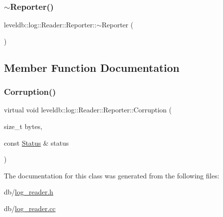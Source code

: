 \subsubsection{\texorpdfstring{$\sim$Reporter()}{~Reporter()}}
{\footnotesize\ttfamily leveldb\+::log\+::\+Reader\+::\+Reporter\+::$\sim$\+Reporter (\begin{DoxyParamCaption}{ }\end{DoxyParamCaption})\hspace{0.3cm}{\ttfamily [virtual]}}



\subsection{Member Function Documentation}
\mbox{\label{classleveldb_1_1log_1_1_reader_1_1_reporter_a2d28d30f9559d5fc9f94af41d239932e}} 
\subsubsection{\texorpdfstring{Corruption()}{Corruption()}}
{\footnotesize\ttfamily virtual void leveldb\+::log\+::\+Reader\+::\+Reporter\+::\+Corruption (\begin{DoxyParamCaption}\item[{size\+\_\+t}]{bytes,  }\item[{const \mbox{\hyperlink{classleveldb_1_1_status}{Status}} \&}]{status }\end{DoxyParamCaption})\hspace{0.3cm}{\ttfamily [pure virtual]}}



The documentation for this class was generated from the following files\+:\begin{DoxyCompactItemize}
\item 
db/\mbox{\hyperlink{log__reader_8h}{log\+\_\+reader.\+h}}\item 
db/\mbox{\hyperlink{log__reader_8cc}{log\+\_\+reader.\+cc}}\end{DoxyCompactItemize}
